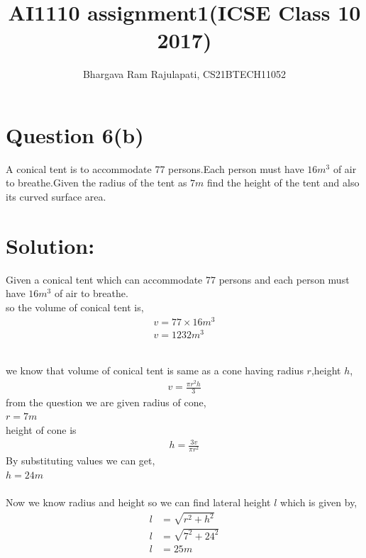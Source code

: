 \documentclass[article,12pt,twocolumn]{IEEEtran}
\title{AI1110 assignment1(ICSE Class 10 2017)}
\author{Bhargava Ram Rajulapati, CS21BTECH11052}
\begin{document}
  \maketitle
  \section*{Question 6(b)}
   A conical tent is to accommodate 77 persons.Each person must  
   have $16m^3$ of air to breathe.Given the radius of the tent as
   $7m$ find the height of the tent and also its curved surface
   area.\\
  \section*{Solution:}
  Given a conical tent which can accommodate 77 persons and each         
   person must have $16m^3$ of air to breathe.\\
  so the volume of conical tent is,
  \begin{align}
    v = 77 \times 16 m^3 \\
    v = 1232 m^3  
  \end{align}
   \begin{table}[h!]
     \centering
   
    \caption{}
    \label{table:Table1}
  \end{table} \\
  we know that volume of conical tent is same as a cone having
  radius $r$,height $h$,
  \begin{align}
     v = \frac{\pi r^2 h}{3} 
  \end{align}
  from the question we are given radius of cone, \\
  $ r = 7 m $\\ 
  height of cone is
  \begin{align}
   h = \frac{3 v}{\pi r^2} 
  \end{align}
  By substituting values we can get, \\
  $ h = 24 m $ \\\\
  Now we know radius and height so we can find lateral height $l$
  which is given by,
  \begin{align}
     l &= \sqrt{r^2 + h^2}
     \\
     l &= \sqrt{7^2 + 24^2}
     \\
     l &= 25 m
  \end{align} 
  
\end{document}
